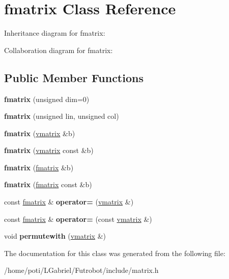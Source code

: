 \hypertarget{classfmatrix}{}\section{fmatrix Class Reference}
\label{classfmatrix}


Inheritance diagram for fmatrix\+:


Collaboration diagram for fmatrix\+:
\subsection*{Public Member Functions}
\begin{DoxyCompactItemize}
\item 
{\bfseries fmatrix} (unsigned dim=0)\hypertarget{classfmatrix_ad4c38f6f3410100f233e7d75b58bd79b}{}\label{classfmatrix_ad4c38f6f3410100f233e7d75b58bd79b}

\item 
{\bfseries fmatrix} (unsigned lin, unsigned col)\hypertarget{classfmatrix_aa396ec6e74dc8eff2c31dd088ae0dc6a}{}\label{classfmatrix_aa396ec6e74dc8eff2c31dd088ae0dc6a}

\item 
{\bfseries fmatrix} (\hyperlink{classvmatrix}{vmatrix} \&b)\hypertarget{classfmatrix_a63a97660f22f332fec04b3ea4b26aae3}{}\label{classfmatrix_a63a97660f22f332fec04b3ea4b26aae3}

\item 
{\bfseries fmatrix} (\hyperlink{classvmatrix}{vmatrix} const \&b)\hypertarget{classfmatrix_ae9dbb10d6ca0c20e274c21156f346a4d}{}\label{classfmatrix_ae9dbb10d6ca0c20e274c21156f346a4d}

\item 
{\bfseries fmatrix} (\hyperlink{classfmatrix}{fmatrix} \&b)\hypertarget{classfmatrix_ad02db236c497a03dac3f3ebabc871ba5}{}\label{classfmatrix_ad02db236c497a03dac3f3ebabc871ba5}

\item 
{\bfseries fmatrix} (\hyperlink{classfmatrix}{fmatrix} const \&b)\hypertarget{classfmatrix_a467a4514a28602bf45c1e35795fbf437}{}\label{classfmatrix_a467a4514a28602bf45c1e35795fbf437}

\item 
const \hyperlink{classfmatrix}{fmatrix} \& {\bfseries operator=} (\hyperlink{classvmatrix}{vmatrix} \&)\hypertarget{classfmatrix_a1a58053d4d29383f41c7003d07d74b9a}{}\label{classfmatrix_a1a58053d4d29383f41c7003d07d74b9a}

\item 
const \hyperlink{classfmatrix}{fmatrix} \& {\bfseries operator=} (const \hyperlink{classvmatrix}{vmatrix} \&)\hypertarget{classfmatrix_a16bd4682891f84a3836e4fb455369c46}{}\label{classfmatrix_a16bd4682891f84a3836e4fb455369c46}

\item 
void {\bfseries permutewith} (\hyperlink{classvmatrix}{vmatrix} \&)\hypertarget{classfmatrix_a0391d200ec0958a4f50b3fe47e5ab165}{}\label{classfmatrix_a0391d200ec0958a4f50b3fe47e5ab165}

\end{DoxyCompactItemize}


The documentation for this class was generated from the following file\+:\begin{DoxyCompactItemize}
\item 
/home/poti/\+L\+Gabriel/\+Futrobot/include/matrix.\+h\end{DoxyCompactItemize}
